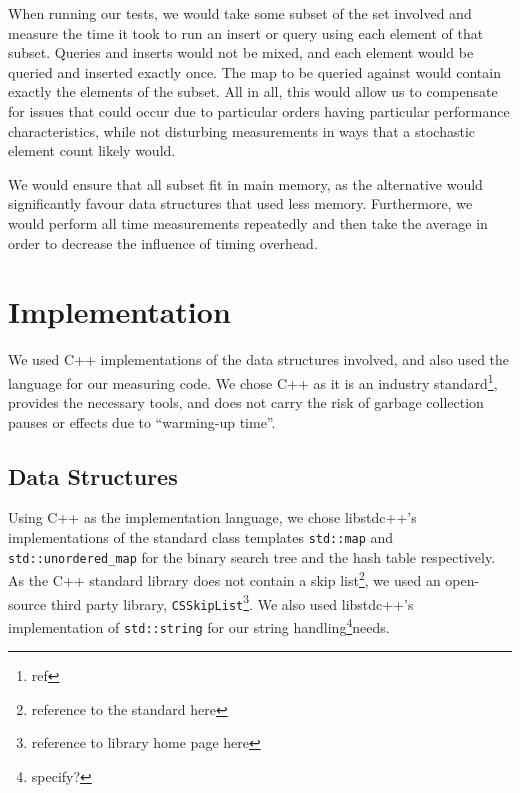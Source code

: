\documentclass[12pt,a4paper]{article}
\begin{document}
    When running our tests, we would take some subset of the set involved and measure the time it
    took to run an insert or query using each element of that subset.  Queries and inserts would not
    be mixed, and each element would be queried and inserted exactly once.  The map to be queried
    against would contain exactly the elements of the subset.  All in all, this would allow us to
    compensate for issues that could occur due to particular orders having particular performance
    characteristics, while not disturbing measurements in ways that a stochastic element count
    likely would.

    We would ensure that all subset fit in main memory, as the alternative would significantly
    favour data structures that used less memory.  Furthermore, we would perform all time
    measurements repeatedly and then take the average in order to decrease the influence of timing
    overhead.


    \section{Implementation}
    \label{sec:implementation}

    We used C++ implementations of the data structures involved, and also used the language for our
    measuring code.  We chose C++ as it is an industry standard\footnote{ref}, provides the
    necessary tools, and does not carry the risk of garbage collection pauses or effects due to
    ``warming-up time''.

    \subsection{Data Structures}

    Using C++ as the implementation language, we chose libstdc++'s implementations of the standard class
    templates \texttt{std::map} and \texttt{std::unordered\_map} for the binary search
    tree and the hash table respectively.  As the C++ standard library does not contain a skip
    list\footnote{reference to the standard here}, we used an open-source third party library,
    \texttt{CSSkipList}\footnote{reference to library home page here}.  We also used libstdc++'s
    implementation of \texttt{std::string} for our string handling\footnote{specify?}needs.
\end{document}
